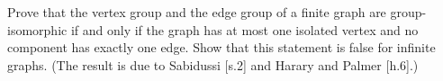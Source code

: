Prove that the vertex group and the edge group of a finite graph are group-isomorphic if and only if the graph has at most one isolated vertex and no component has exactly one edge. Show that this statement is false for infinite graphs. (The result is due to Sabidussi [s.2] and Harary and Palmer [h.6].)